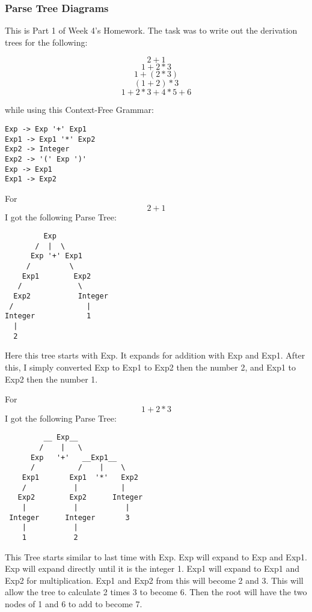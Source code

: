 \documentclass{article}
\theoremstyle{theorem}
\theoremstyle{definition}
\theoremstyle{remark}
\begin{document}
\subsubsection{Parse Tree Diagrams}
This is Part 1 of Week 4's Homework. The task was to write out the derivation trees for the following:

$$2+1$$
$$1+2*3$$
$$1+(2*3)$$
$$(1+2)*3$$
$$1+2*3+4*5+6$$

\noindent\newline while using this Context-Free Grammar:

\begin{verbatim}
Exp -> Exp '+' Exp1 
Exp1 -> Exp1 '*' Exp2              
Exp2 -> Integer            
Exp2 -> '(' Exp ')'  
Exp -> Exp1             
Exp1 -> Exp2                                     
\end{verbatim}


\noindent\newline For $$2+1$$ I got the following Parse Tree:

\begin{verbatim}
         Exp
       /  |  \
      Exp '+' Exp1
     /         \
    Exp1        Exp2
   /             \
  Exp2           Integer
 /                 |
Integer            1
  |
  2
\end{verbatim}
\noindent\newline Here this tree starts with Exp. It expands for addition with Exp and Exp1. After this, I simply converted Exp to Exp1 to Exp2 then the number 2, and Exp1 to Exp2 then the number 1.

\noindent\newline\newline For $$1+2*3$$ I got the following Parse Tree:

\begin{verbatim}
         __ Exp__
        /    |   \
      Exp   '+'   __Exp1__
      /          /    |    \
    Exp1       Exp1  '*'   Exp2
    /           |          |
   Exp2        Exp2      Integer
    |           |           |
 Integer      Integer       3
    |           |
    1           2
    \end{verbatim}
\noindent\newline This Tree starts similar to last time with Exp. Exp will expand to Exp and Exp1. Exp will expand directly until it is the integer 1. Exp1 will expand to Exp1 and Exp2 for multiplication. Exp1 and Exp2 from this will become 2 and 3. This will allow the tree to calculate 2 times 3 to become 6. Then the root will have the two nodes of 1 and 6 to add to become 7.
\end{document}
